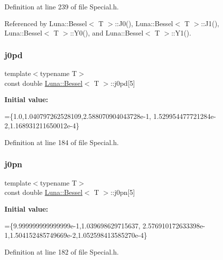 Definition at line 239 of file Special.\+h.



Referenced by Luna\+::\+Bessel$<$ T $>$\+::\+J0(), Luna\+::\+Bessel$<$ T $>$\+::\+J1(), Luna\+::\+Bessel$<$ T $>$\+::\+Y0(), and Luna\+::\+Bessel$<$ T $>$\+::\+Y1().

\mbox{\label{structLuna_1_1Bessel_af55d98ad282898bd505468892ccd1eb1}} 
\subsubsection{\texorpdfstring{j0pd}{j0pd}}
{\footnotesize\ttfamily template$<$typename T$>$ \\
const double \hyperlink{structLuna_1_1Bessel}{Luna\+::\+Bessel}$<$ T $>$\+::j0pd\mbox{[}5\mbox{]}}

{\bfseries Initial value\+:}
\begin{DoxyCode}
=\{1.0,1.040797262528109,2.588070904043728e-1,
        1.529954477721284e-2,1.168931211650012e-4\}
\end{DoxyCode}


Definition at line 184 of file Special.\+h.

\mbox{\label{structLuna_1_1Bessel_aeb87c7ddc34900a7b9dcd123c49c31fe}} 
\subsubsection{\texorpdfstring{j0pn}{j0pn}}
{\footnotesize\ttfamily template$<$typename T$>$ \\
const double \hyperlink{structLuna_1_1Bessel}{Luna\+::\+Bessel}$<$ T $>$\+::j0pn\mbox{[}5\mbox{]}}

{\bfseries Initial value\+:}
\begin{DoxyCode}
=\{9.999999999999999e-1,1.039698629715637,
        2.576910172633398e-1,1.504152485749669e-2,1.052598413585270e-4\}
\end{DoxyCode}


Definition at line 182 of file Special.\+h.

\mbox{\label{structLuna_1_1Bessel_a6f9e1aebe0a5d93388b3b14c67513886}} 
